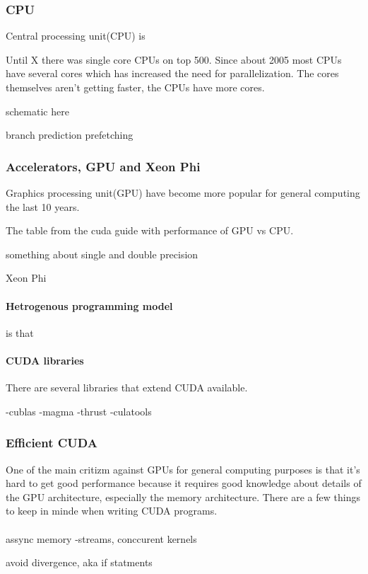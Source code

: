\documentclass[10pt,a4paper]{article}
\begin{document}
\subsubsection{CPU}
Central processing unit(CPU) is 

Until X there was single core CPUs on top 500. Since about 2005 most CPUs have several cores which has increased the need for parallelization. The cores themselves aren't getting faster, the CPUs have more cores.

schematic here

branch prediction
prefetching

\subsubsection{Accelerators, GPU and Xeon Phi}
Graphics processing unit(GPU) have become more popular for general computing the last 10 years.

The table from the cuda guide with performance of GPU vs CPU.\cite{cuda}

something about single and double precision

Xeon Phi

\paragraph{Hetrogenous programming model}
is that

\paragraph{CUDA libraries}
There are several libraries that extend CUDA available.

-cublas
-magma
-thrust
-culatools


\subsubsection{Efficient CUDA}
One of the main critizm against GPUs for general computing purposes is that it's hard to get good performance because it requires good knowledge about details of the GPU architecture, especially the memory architecture. There are a few things to keep in minde when writing CUDA programs.\\
\\
assync memory
-streams, conccurent kernels

avoid divergence, aka if statments
\end{document}
